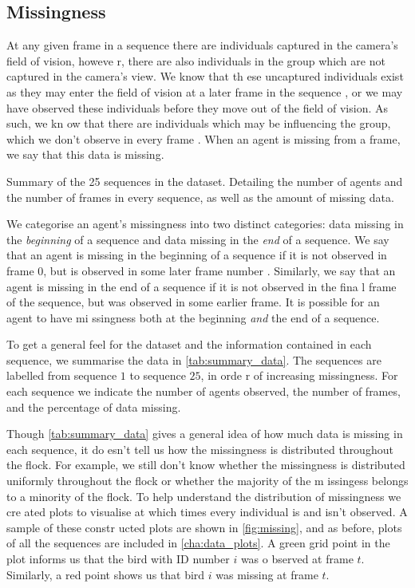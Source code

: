 \subsection{Missingness}
\label{ssec:missingness}

At any given frame in a sequence there are individuals captured in the camera's field of vision, howeve
r, there are also individuals in the group which are not captured in the camera's view. We know that th
ese uncaptured individuals exist as they may enter the field of vision at a later frame in the sequence
, or we may have observed these individuals before they move out of the field of vision. As such, we kn
ow that there are individuals which may be influencing the group, which we don't observe in every frame
. When an agent is missing from a frame, we say that this data is missing.

\begin{table}[!tbp]
	
		\caption{Summary of the 25 sequences in the dataset. Detailing the number of agents and the number
of frames in every sequence, as well as the amount of missing data.}
	\label{tab:summary_data}
\end{table}

We categorise an agent's missingness into two distinct categories: data missing in the \emph{beginning}
 of a sequence and data missing in the \emph{end} of a sequence. We say that an agent is missing in the
 beginning of a sequence if it is not observed in frame $0$, but is observed in some later frame number
. Similarly, we say that an agent is missing in the end of a sequence if it is not observed in the fina
l frame of the sequence, but was observed in some earlier frame. It is possible for an agent to have mi
ssingness both at the beginning \emph{and} the end of a sequence.

To get a general feel for the dataset and the information contained in each sequence, we summarise the 
data in \cref{tab:summary_data}. The sequences are labelled from sequence $1$ to sequence $25$, in orde
r of increasing missingness. For each sequence we indicate the number of agents observed, the number of
 frames, and the percentage of data missing.

Though \cref{tab:summary_data} gives a general idea of how much data is missing in each sequence, it do
esn't tell us how the missingness is distributed throughout the flock. For example, we still don't know
 whether the missingness is distributed uniformly throughout the flock or whether the majority of the m
issingess belongs to a minority of the flock. To help understand the distribution of missingness we cre
ated plots to visualise at which times every individual is and isn't observed. A sample of these constr
ucted plots are shown in \cref{fig:missing}, and as before, plots of all the sequences are included in 
\cref{cha:data_plots}. A green grid point in the plot informs us that the bird with ID number $i$ was o
bserved at frame $t$. Similarly, a red point shows us that bird $i$ was missing at frame $t$.

